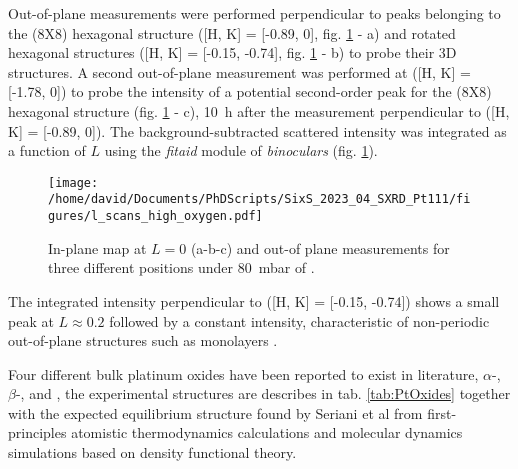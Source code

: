 Out-of-plane measurements were performed perpendicular to peaks belonging to the (8X8) hexagonal structure ([H, K] = [-0.89, 0], fig. \ref{fig:LScans80} - a) and rotated hexagonal structures ([H, K] = [-0.15, -0.74], fig. \ref{fig:LScans80} - b) to probe their 3D structures.
A second out-of-plane measurement was performed at ([H, K] = [-1.78, 0]) to probe the intensity of a potential second-order peak for the (8X8) hexagonal structure (fig. \ref{fig:LScans80} - c), \qty{10}{\hour} after the measurement perpendicular to ([H, K] = [-0.89, 0]).
The background-subtracted scattered intensity was integrated as a function of $L$ using the \textit{fitaid} module of \textit{binoculars} (fig. \ref{fig:LScans80}).

\begin{figure}[!htb]
    \centering
    \texttt{[image: /home/david/Documents/PhDScripts/SixS\_2023\_04\_SXRD\_Pt111/figures/l\_scans\_high\_oxygen.pdf]}
    \caption{
        In-plane map at $L=0$ (a-b-c) and out-of plane measurements for three different positions under \qty{80}{\milli\bar} of .
    }
    \label{fig:LScans80}
\end{figure}

The integrated intensity perpendicular to ([H, K] = [-0.15, -0.74]) shows a small peak at $L\approx 0.2$ followed by a constant intensity, characteristic of non-periodic out-of-plane structures such as monolayers \parencite{Robinson1991}.

Four different bulk platinum oxides have been reported to exist in literature, $\alpha$-, $\beta$-,  and , the experimental structures are describes in tab. \ref{tab:PtOxides} together with the expected equilibrium structure found by Seriani et al \parencite*{Seriani2006, Seriani2008} from first-principles atomistic thermodynamics calculations and molecular dynamics simulations based on density functional theory.

